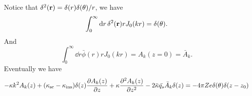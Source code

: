 \documentclass[10pt]{article}
\begin{document}
Notice that $\delta^2(\vb{r}) = \delta(r) \delta(\theta) / r$, we have 
\begin{equation}
	\int_0^{\infty} \dd{r} \delta^2(\vb{r}) r J_0(k r) = \delta(\theta).
\end{equation}
And 
\begin{equation}
	\int_0^{\infty} \dd{r} \bar{\phi}(r) r J_0(k r) = A_k(z=0) = \bar{A}_k.
\end{equation}
Eventually we have 
\begin{equation}
	- \kappa k^2 A_k(z) + (\kappa_{\text{sc}} - \kappa_{\text{ins}}) \delta(z) \pdv{A_k(z)}{z} + \kappa \pdv[2]{A_k(z)}{z} - 2 \bar{\kappa} \bar{q_s} \bar{A}_k \delta(z) = -4\pi Z e \delta(\theta) \delta(z - z_0)
\end{equation}



	
\end{document}
